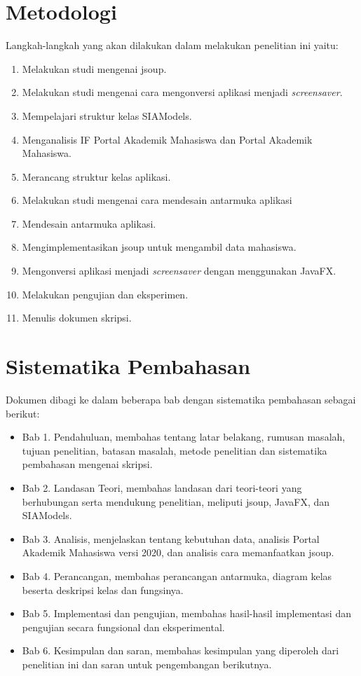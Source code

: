 \section{Metodologi}
\label{sec:metlit}
Langkah-langkah yang akan dilakukan dalam melakukan penelitian ini yaitu:
	\begin{enumerate}
		\item Melakukan studi mengenai jsoup.
		\item Melakukan studi mengenai cara mengonversi aplikasi menjadi \textit{screensaver}.
		\item Mempelajari struktur kelas SIAModels.
		\item Menganalisis IF Portal Akademik Mahasiswa dan Portal Akademik Mahasiswa.
		\item Merancang struktur kelas aplikasi.
		\item Melakukan studi mengenai cara mendesain antarmuka aplikasi
	    \item Mendesain antarmuka aplikasi.
	    \item Mengimplementasikan jsoup untuk mengambil data mahasiswa.
        \item Mengonversi aplikasi menjadi \textit{screensaver} dengan menggunakan JavaFX. 
		\item Melakukan pengujian dan eksperimen.
		\item Menulis dokumen skripsi.
	\end{enumerate}

\section{Sistematika Pembahasan}
\label{sec:sispem}
Dokumen dibagi ke dalam beberapa bab dengan sistematika pembahasan sebagai berikut:
    \begin{itemize}
        \item Bab 1. Pendahuluan, membahas tentang latar belakang, rumusan masalah, tujuan penelitian, batasan masalah, metode penelitian dan sistematika pembahasan mengenai skripsi.
        \item Bab 2. Landasan Teori, membahas landasan dari teori-teori yang berhubungan serta mendukung penelitian, meliputi jsoup, JavaFX, dan SIAModels. 
        \item Bab 3. Analisis, menjelaskan tentang kebutuhan data, analisis Portal Akademik Mahasiswa versi 2020, dan analisis cara memanfaatkan jsoup.
        \item Bab 4. Perancangan, membahas perancangan antarmuka, diagram kelas beserta deskripsi kelas dan fungsinya.
        \item Bab 5. Implementasi dan pengujian, membahas hasil-hasil implementasi dan pengujian secara fungsional dan eksperimental.
        \item Bab 6. Kesimpulan dan saran, membahas kesimpulan yang diperoleh dari penelitian ini dan saran untuk pengembangan berikutnya.
    \end{itemize}